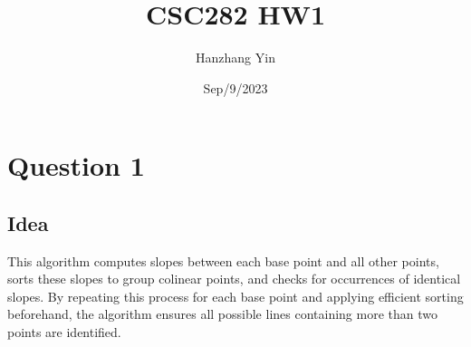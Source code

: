 \documentclass{article}
\title{CSC282 HW1}
\author{Hanzhang Yin}
\date{Sep/9/2023}
\begin{document}
\maketitle

\section*{Question 1}

\subsection*{Idea}
This algorithm computes slopes between each base point and all other points, sorts these slopes to group colinear points, and checks for occurrences of identical slopes. By repeating this process for each base point and applying efficient sorting beforehand, the algorithm ensures all possible lines containing more than two points are identified.
\end{document}
